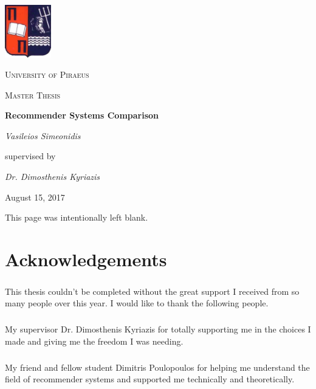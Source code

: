 \documentclass[12pt, a4paper]{report}
\begin{document}
	\begin{titlepage}
		\centering
		\includegraphics[width=0.15\textwidth]{images/UniversityOfPiraeusLogo.png}\par\vspace{1cm}
		{\scshape\LARGE University of Piraeus \par}
		\vspace{1cm}
		{\scshape\Large Master Thesis\par}
		\vspace{1.5cm}
		{\huge\bfseries Recommender Systems Comparison\par}
		\vspace{2cm}
		{\Large\itshape Vasileios Simeonidis\par}
		\vspace{6cm}
		supervised by\par
		\textit{Dr. Dimosthenis Kyriazis}
		\vfill
		{\large August 15, 2017\par}
	\end{titlepage}


\newpage
\tableofcontents
{}
\newpage
{}
\begin{center}
This page was intentionally left blank.
\end{center}
\newpage
\chapter*{Acknowledgements}

\paragraph{} This thesis couldn't be completed without the great support I received from so many people over this year. I would like to thank the following people.

\paragraph{} My supervisor Dr. Dimosthenis Kyriazis for totally supporting me in the choices I made and giving me the freedom I was needing.

\paragraph{} My friend and fellow student Dimitris Poulopoulos for helping me understand the field of recommender systems and supported me technically and theoretically.
\end{document}

